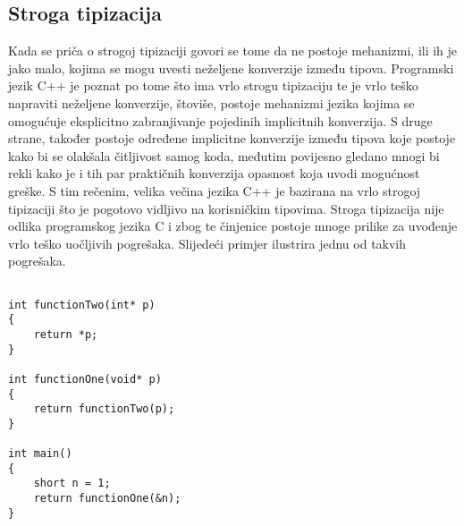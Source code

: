 \subsection{Stroga tipizacija}
Kada se priča o strogoj tipizaciji govori se tome da ne postoje mehanizmi, ili ih je jako malo, kojima se mogu uvesti neželjene konverzije između tipova. Programski jezik C++ je poznat po tome što ima vrlo strogu tipizaciju te je vrlo teško napraviti neželjene konverzije, štoviše, postoje mehanizmi jezika kojima se omogućuje eksplicitno zabranjivanje pojedinih implicitnih konverzija. S druge strane, također postoje određene implicitne konverzije između tipova koje postoje kako bi se olakšala čitljivost samog koda, međutim povijesno gledano mnogi bi rekli kako je i tih par praktičnih konverzija opasnost koja uvodi mogućnost greške. S tim rečenim, velika večina jezika C++ je bazirana na vrlo strogoj tipizaciji što je pogotovo vidljivo na korisničkim tipovima. Stroga tipizacija nije odlika programskog jezika C i zbog te činjenice postoje mnoge prilike za uvođenje vrlo teško uočljivih pogrešaka. Slijedeći primjer ilustrira jednu od takvih pogrešaka.
\lstset{language=C, tabsize=2, frame=single, breaklines=true}
\begin{lstlisting}

int functionTwo(int* p)
{
    return *p;
}

int functionOne(void* p)
{
    return functionTwo(p);
}

int main()
{
    short n = 1;
    return functionOne(&n);
}
\end{lstlisting}
